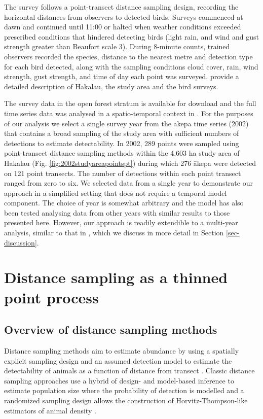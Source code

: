 \documentclass{stylefile16/statsoc}
\newcommand{\akepa}{\textquotesingle\={a}kepa}  %
\begin{document}
The survey follows a point-transect distance sampling design, recording the horizontal distances from observers to detected birds. Surveys commenced at dawn and continued until 11:00 or halted when weather conditions exceeded prescribed conditions that hindered detecting birds (light rain, and wind and gust strength greater than Beaufort scale 3). During 8-minute counts, trained observers recorded the species, distance to the nearest metre and detection type for each bird detected, along with the sampling conditions cloud cover, rain, wind strength, gust strength, and time of day each point was surveyed.  \cite{camp_population_2010,camp_statespace_2016} provide a detailed description of Hakalau, the study area and the bird surveys.

The survey data in the open forest stratum is available for download \citep{camp_datarelease_2002} and the full time series data was analysed in a spatio-temporal context in \citep{camp_dsm_2020}.  For the purposes of our analysis we select a single survey year from the \akepa{} time series (2002) that contains a broad sampling of the study area with sufficient numbers of detections to estimate detectability. In 2002, 289 points were sampled using point-transect distance sampling methods within the 4,603 ha study area of Hakalau (Fig. \ref{fig:2002studyareapointspt}) during which 276 \akepa{} were detected on 121 point transects. The number of detections within each point transect ranged from zero to six. We selected data from a single year to demonstrate our approach in a simplified setting that does not require a temporal model component.  The choice of year is somewhat arbitrary and the model has also been tested analysing data from other years with similar results to those presented here.  However, our approach is readily extendible to a multi-year analysis, similar to that in \cite{camp_dsm_2020}, which we discuss in more detail in Section \ref{sec-discussion}.

\section{Distance sampling as a thinned point process}
\label{sec-ds-pp}

\subsection{Overview of distance sampling methods}

Distance sampling methods aim to estimate abundance by using a spatially explicit sampling design and an assumed detection model to estimate the detectability of animals as a function of distance from transect \citep{buckland_advanced_2004, buckland_distance_2015}.  Classic distance sampling approaches use a hybrid of design- and model-based inference to estimate population size where the probability of detection is modelled and a randomized sampling design allows the construction of Horvitz-Thompson-like estimators of animal density \citep{horvitz_generalization_1952,  buckland_advanced_2004}.
\end{document}
